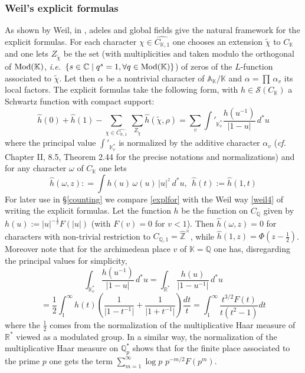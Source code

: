 \documentclass[12pt]{article}
\def\mmod{{\rm Mod}}
\def\A{{\mathbb A}}
\def\C{{\mathbb C}}
\def\K{{\mathbb K}}
\def\Q{{\mathbb Q}}
\def\R{{\mathbb R}}
\def\Z{{\mathbb Z}}
\def\hatz{{\hat\Z^\times}}
\def\cS{{\mathcal S}}
\newcommand{\ie}{{\it i.e.\/}\ }
\newcommand{\cff}{{\it cf.}~}
\begin{document}
\subsubsection{Weil's explicit formulas}\label{sectweilexpl}

As shown by Weil, in \cite{weilpos}, adeles and global fields give the natural framework for the explicit formulas.  For each character $\chi\in \widehat{C_{\K,1}}$ one chooses an extension $\tilde \chi$ to $C_\K$ and one lets $Z_{\tilde\chi}$ be the set (with multiplicities and taken modulo the orthogonal of $\mmod(\K)$, \ie $\{s\in\C\mid q^s=1, \forall q\in \mmod(\K)\}$) of zeros of the $L$-function associated to $\tilde\chi$.
Let  then $ \alpha$ be a nontrivial character of 
 $\A_\K/\K$ and $ \alpha = \prod \,  \alpha_v$ its local factors. The explicit formulas take the following form, with $h \in \cS (C_\K)$ a Schwartz function with compact support:
\begin{equation}\label{weil4}
\hat h (0) + \hat h (1)  - \sum_{\chi\in \widehat{C_{\K,1}}}\,
\sum_{Z_{\tilde\chi}} \hat h (\tilde\chi , \rho) = \sum_v
\int'_{\K_v^*} \frac{h(u^{-1}) }{   \vert 1-u   \vert} \, d^* u
\end{equation}
where  the principal value $\int'_{\K_v^*}$ is normalized by the additive character $ \alpha_v$ (\cff\cite{CMbook} Chapter II, 8.5, Theorem 2.44 for the precise notations and normalizations) and for any character $\omega$ of $C_\K$ one lets
\begin{equation}\label{fourier}
\hat h (\omega , z): = \int h(u) \,
\omega(u) \,   \vert u   \vert^z \, d^* u, \  \  \hat h (t):=\hat h (1,t)
\end{equation}
For later use in \S \ref{counting} we compare \eqref{explfor} with the Weil way \eqref{weil4} of writing the explicit formulas. Let the function $h$ be the function on $C_\Q$ given by $h(u):=\vert u\vert^{-\frac 12}F(\vert u\vert)$ (with $F(v)=0$ for $v<1$). Then $\hat h (\omega , z)=0$ for  characters with non-trivial restriction to  $C_{\Q,1}=\hatz$, while  $\hat h (1 , z)=\Phi(z-\frac 12)$. Moreover note that
for the archimedean place $v$ of $\K=\Q$ one has, disregarding the principal values for simplicity, 
$$
\int_{\K_v^*} \frac{h(u^{-1}) }{   \vert 1-u   \vert} \, d^* u=\int_{\R^*} \frac{h(u) }{   \vert 1-u^{-1}   \vert} \, d^* u
$$
$$
=\frac 12\int_1^\infty h(t)\left( \frac{1}{\vert 1-t^{-1}\vert}+\frac{1}{\vert 1+t^{-1}\vert}\right)\frac{dt}{t}=\int_1^\infty\frac{t^{3/2}F(t)}{t(t^2-1)}dt
$$
where the $\frac 12$ comes from the normalization of the multiplicative Haar measure of $\R^*$ viewed as a modulated group.  In a similar way,  the normalization of the multiplicative Haar measure on $\Q_p^*$ shows that for the finite place associated to the prime $p$  one gets
 the term $\sum_{m=1}^\infty \log p \,\,p^{-m/2}F(p^m)$.
\end{document}
